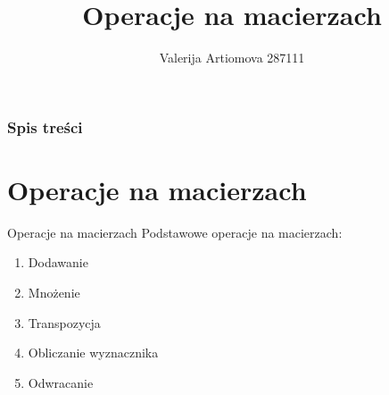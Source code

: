 \documentclass[polish,10pt]{beamer}
\title{Operacje na macierzach}
\author{Valerija Artiomova 287111}
\begin{document}
\maketitle

\begin{frame}
    \frametitle{Spis treści}
    \tableofcontents[]
\end{frame}

\section{Operacje na macierzach}
\begin{frame}{Operacje na macierzach}
Podstawowe operacje na macierzach:
    \begin{enumerate}
        \item Dodawanie 
        \item Mnożenie
        \item Transpozycja
        \item Obliczanie wyznacznika
        \item Odwracanie
    \end{enumerate}
\end{frame}
\end{document}
